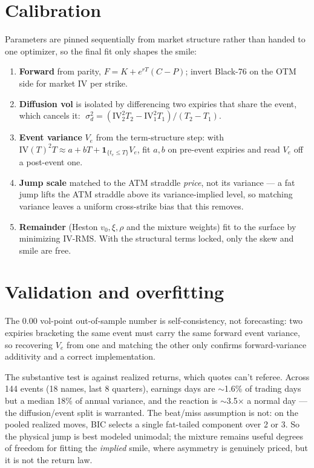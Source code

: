 \documentclass[11pt]{article}
\begin{document}
\section{Calibration}

Parameters are pinned sequentially from market structure rather than handed to one
optimizer, so the final fit only shapes the smile:
\begin{enumerate}\itemsep2pt
\item \textbf{Forward} from parity, $F=K+e^{rT}(C-P)$; invert Black-76 on the OTM
side for market IV per strike.
\item \textbf{Diffusion vol} is isolated by differencing two expiries that share
the event, which cancels it:
$\;\sigma_d^2=(\text{IV}_2^2 T_2-\text{IV}_1^2 T_1)/(T_2-T_1)$.
\item \textbf{Event variance} $V_e$ from the term-structure step: with
$\text{IV}(T)^2T\approx a+bT+\mathbf1_{\{t_e\le T\}}V_e$, fit $a,b$ on pre-event
expiries and read $V_e$ off a post-event one.
\item \textbf{Jump scale} matched to the ATM straddle \emph{price}, not its
variance --- a fat jump lifts the ATM straddle above its variance-implied level, so
matching variance leaves a uniform cross-strike bias that this removes.
\item \textbf{Remainder} (Heston $v_0,\xi,\rho$ and the mixture weights) fit to the
surface by minimizing IV-RMS. With the structural terms locked, only the skew and
smile are free.
\end{enumerate}

\section{Validation and overfitting}

The $0.00$ vol-point out-of-sample number is self-consistency, not forecasting: two
expiries bracketing the same event must carry the same forward event variance, so
recovering $V_e$ from one and matching the other only confirms forward-variance
additivity and a correct implementation.

The substantive test is against realized returns, which quotes can't referee.
Across 144 events (18 names, last 8 quarters), earnings days are $\sim$1.6\% of
trading days but a median 18\% of annual variance, and the reaction is
$\sim$3.5$\times$ a normal day --- the diffusion/event split is warranted. The
beat/miss assumption is not: on the pooled realized moves, BIC selects a single
fat-tailed component over 2 or 3. So the physical jump is best modeled unimodal;
the mixture remains useful degrees of freedom for fitting the \emph{implied} smile,
where asymmetry is genuinely priced, but it is not the return law.
\end{document}
